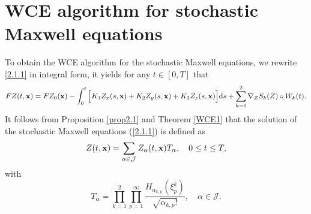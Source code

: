 \documentclass[preprint,12pt]{article}
\numberwithin{figure}{section}
\numberwithin{table}{section}
\numberwithin{equation}{section}
\begin{document}
\section{WCE algorithm for stochastic Maxwell equations}
\label{sec:WCE}
To obtain the WCE algorithm for the stochastic Maxwell equations, we rewrite \eqref{2.1.1} in integral form, it yields for any $t\in[0,T]$ that
\begin{equation}\label{3.1}
FZ(t,{\bf x})=FZ_0({\bf x})-\int_{0}^{t}\Big[K_1Z_{x}(s,{\bf x})+K_2Z_{y}(s,{\bf x})+K_3Z_{z}(s,{\bf x})\Big]{\rm d}s+\sum_{k=1}^2\nabla_Z S_{k}(Z)\circ W_{k}(t).
\end{equation}
It follows from Proposition \ref{prop2.1} and Theorem \ref{WCE1} that the solution of the stochastic Maxwell equations (\ref{2.1.1}) is defined as
\begin{align*}
  Z(t,{\bf x})=\sum_{\alpha\in\mathcal{J}} Z_{\alpha}(t,{\bf x})T_{\alpha},\quad0\leq t\leq T,
\end{align*}
with 
\begin{equation*}
	T_{\alpha}=\prod_{k=1}^2\prod_{p=1}^{\infty}\frac{H_{\alpha_{k,p}}(\xi_{p}^{k})}{\sqrt{\alpha_{k,p}!}},\quad \alpha\in\mathcal{J}.
\end{equation*}
\end{document}
